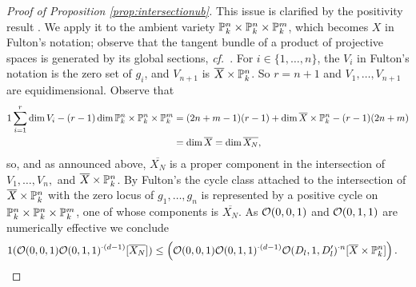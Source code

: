 \begin{proof}[Proof of Proposition \ref{prop:intersectionub}]
This issue is clarified by the positivity result \cite[Corollary
12.2.(a)]{Fulton}. We apply it to the ambient
variety 
${\mathbb{P}}_k^n\times{\mathbb{P}}_k^n\times{\mathbb{P}}_k^m$, which becomes $X$ in Fulton's
notation; observe that
 the tangent bundle of a product of projective spaces
is generated by its global sections, \textit{cf.}~\cite[Examples 12.2.1.(a) and
(c)]{Fulton}. For $i\in\{1,\ldots,n\}$, the $V_i$ in Fulton's notation
is the zero set of $g_i$, and $V_{n+1}$ is 
$\overline{X} \times {\mathbb{P}}_k^n$. So $r=n+1$ and $V_1,\ldots,V_{n+1}$ are
equidimensional. 
Observe that
\begin{alignat*}1
  \sum_{i=1}^{r} \dim V_i  - (r-1) \dim
  \IP_k^n\times\IP_k^n\times\IP_k^m
  &= (2n+m-1)(r-1) + \dim\overline{X}\times\IP_k^n
  - (r-1)(2n+m)
  \\
  &= \dim \overline{X} = \dim \overline{X_N},
\end{alignat*}
so, and as announced above, $\overline{X_N}$ is a proper component in the intersection of
$V_1,\ldots,V_n,$ and $\overline{X} \times {\mathbb{P}}_k^n$.
By Fulton's \cite[Corollary
12.2.(a)]{Fulton} the  cycle class
attached to the intersection of $\overline X\times{\mathbb{P}}_k^n$ with the zero
locus of $g_1,\ldots,g_n$
is represented by a positive cycle on
${\mathbb{P}}_k^n\times{\mathbb{P}}_k^n\times{\mathbb{P}}_k^m$, one of
whose components is $\overline{X_N}$. As ${\mathcal O}(0,0,1)$ and ${\mathcal O}(0,1,1)$
are numerically effective we conclude 
\begin{alignat}1
  \label{eq:inupperboundconclusion1}
  (\cO(0,0,1)  \cO(0,1,1)^{\cdot (d-1)}  [\overline{X_N}])
  &\le
  \left(\cO(0,0,1)  \cO(0,1,1)^{\cdot (d-1)}
  \cO(D_l,1,D'_l)^{\cdot n}  [\overline{X} \times\IP_k^n]\right).
\end{alignat}


\end{proof}

